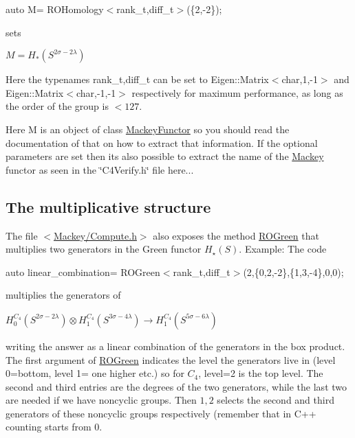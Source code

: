 {\ttfamily  auto M= R\+O\+Homology$<$rank\+\_\+t,diff\+\_\+t$>$(\{2,-\/2\}); }

sets

$ M=H_*(S^{2\sigma-2\lambda})$

Here the typenames {\ttfamily rank\+\_\+t,diff\+\_\+t} can be set to {\ttfamily Eigen\+::\+Matrix$<$char,1,-\/1$>$} and {\ttfamily Eigen\+::\+Matrix$<$char,-\/1,-\/1$>$} respectively for maximum performance, as long as the order of the group is $ <127 $.

Here {\ttfamily M} is an object of class \hyperlink{classMackey_1_1MackeyFunctor}{Mackey\+Functor} so you should read the documentation of that on how to extract that information. If the optional parameters are set then it\textquotesingle{}s also possible to extract the name of the \hyperlink{namespaceMackey}{Mackey} functor as seen in the \char`\"{}\+C4\+Verify.\+h\char`\"{} file here...\hypertarget{use_step1mult}{}\subsection{The multiplicative structure}\label{use_step1mult}
The file {\ttfamily $<$\hyperlink{Compute_8h}{Mackey/\+Compute.\+h}$>$} also exposes the method \hyperlink{namespaceMackey_a2bd86833844ca62d76c47a54aeb0bb77}{R\+O\+Green} that multiplies two generators in the Green functor $H_{\star}(S)$. Example\+: The code

{\ttfamily auto linear\+\_\+combination= R\+O\+Green$<$rank\+\_\+t,diff\+\_\+t$>$(2,\{0,2,-\/2\},\{1,3,-\/4\},0,0);}

multiplies the generators of

$ H_0^{C_4}(S^{2\sigma-2\lambda}) \otimes H_1^{C_4}(S^{3\sigma-4\lambda}) \to H_1^{C_4}(S^{5\sigma-6\lambda}) $

writing the answer as a linear combination of the generators in the box product. The first argument of \hyperlink{namespaceMackey_a2bd86833844ca62d76c47a54aeb0bb77}{R\+O\+Green} indicates the level the generators live in (level 0=bottom, level 1= one higher etc.) so for $C_4$, level=2 is the top level. The second and third entries are the degrees of the two generators, while the last two are needed if we have noncyclic groups. Then $1,2$ selects the second and third generators of these noncyclic groups respectively (remember that in C++ counting starts from $0$.

